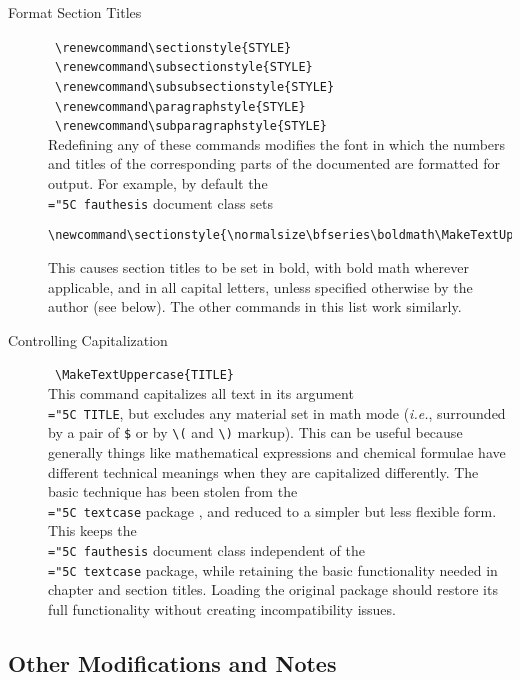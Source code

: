 \documentclass[11pt]{article}
\newcommand\code[1]{{\normalfont\texttt{\let\dv\textsl\chardef\\="5C #1}}}
\begin{document}
\begin{description}
\item[Format Section Titles] \dotfill\ \verb=\renewcommand\sectionstyle{STYLE}=\\
	\null\hfill\ \verb=\renewcommand\subsectionstyle{STYLE}=\\
	\null\hfill\ \verb=\renewcommand\subsubsectionstyle{STYLE}=\\
	\null\hfill\ \verb=\renewcommand\paragraphstyle{STYLE}=\\
	\null\hfill\ \verb=\renewcommand\subparagraphstyle{STYLE}=\\
Redefining any of these commands modifies the font in which the numbers and titles of the corresponding parts of the documented are formatted for output.  For example, by default the \code{fauthesis} document class sets 
%
{\small\begin{verbatim}
\newcommand\sectionstyle{\normalsize\bfseries\boldmath\MakeTextUppercase}
\end{verbatim}}
%
This causes section titles to be set in bold, with bold math wherever applicable, and in all capital letters, unless specified otherwise by the author (see below).  The other commands in this list work similarly.

\item[Controlling Capitalization] \dotfill\ \verb=\MakeTextUppercase{TITLE}=\\
This command capitalizes all text in its argument \code{TITLE}, but excludes any material set in math mode (\textit{i.e.}, surrounded by a pair of \verb=$= or by \verb=\(= and \verb=\)= markup).  This can be useful because generally things like mathematical expressions and chemical formulae have different technical meanings when they are capitalized differently.  The basic technique has been stolen from the \code{textcase} package \cite{C:textcase}, and reduced to a simpler but less flexible form.  This keeps the \code{fauthesis} document class independent of the \code{textcase} package, while retaining the basic functionality needed in chapter and section titles.  Loading the original package should restore its full functionality without creating incompatibility issues.
\end{description}


\subsection{Other Modifications and Notes}
\end{document}
